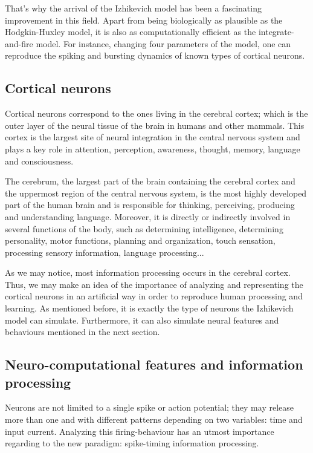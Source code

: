 \documentclass{article} %
\begin{document}
That's why the arrival of the Izhikevich model has been a fascinating improvement in this field. Apart from being biologically as plausible as the Hodgkin-Huxley model, it is also as computationally efficient as the integrate-and-fire model. For instance, changing four parameters of the model, one can reproduce the spiking and bursting dynamics of known types of cortical neurons.

\subsection{Cortical neurons}
Cortical neurons correspond to the ones living in the cerebral cortex; which is the outer layer of the neural tissue of the brain in humans and other mammals. This cortex is the largest site of neural integration in the central nervous system and plays a key role in attention, perception, awareness, thought, memory, language and consciousness.

The cerebrum, the largest part of the brain containing the cerebral cortex and the uppermost region of the central nervous system, is the most highly developed part of the human brain and is responsible for thinking, perceiving, producing and understanding language. Moreover, it is directly or indirectly involved in several functions of the body, such as determining intelligence, determining personality, motor functions, planning and organization, touch sensation, processing sensory information, language processing...

As we may notice, most information processing occurs in the cerebral cortex. Thus, we may make an idea of the importance of analyzing and representing the cortical neurons in an artificial way in order to reproduce human processing and learning. As mentioned before, it is exactly the type of neurons the Izhikevich model can  simulate. Furthermore, it can also simulate neural features and behaviours mentioned in the next section.

\subsection{Neuro-computational features and information processing}
Neurons are not limited to a single spike or action potential; they may release more than one and with different patterns depending on two variables: time and input current. Analyzing this firing-behaviour has an utmost importance regarding to the new paradigm: spike-timing information processing.
\end{document}
